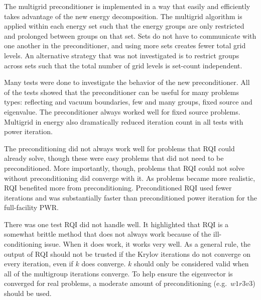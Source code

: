 The multigrid preconditioner is implemented in a way that easily and efficiently takes advantage of the new energy decomposition. The multigrid algorithm is applied within each energy set such that the energy groups are only restricted and prolonged between groups on that set. Sets do not have to communicate with one another in the preconditioner, and using more sets creates fewer total grid levels. An alternative strategy that was not investigated is to restrict groups across sets such that the total number of grid levels is set-count independent. 

Many tests were done to investigate the behavior of the new preconditioner. All of the tests showed that the preconditioner can be useful for many problems types: reflecting and vacuum boundaries, few and many groups, fixed source and eigenvalue. The preconditioner always worked well for fixed source problems. Multigrid in energy also dramatically reduced iteration count in all tests with power iteration. 

The preconditioning did not always work well for problems that RQI could already solve, though these were easy problems that did not need to be preconditioned. More importantly, though, problems that RQI could not solve without preconditioning did converge with it. As problems became more realistic, RQI benefited more from preconditioning. Preconditioned RQI used fewer iterations and was substantially faster than preconditioned power iteration for the full-facility PWR.

There was one test RQI did not handle well. It highlighted that RQI is a somewhat brittle method that does not always work because of the ill-conditioning issue. When it does work, it works very well. As a general rule, the output of RQI should not be trusted if the Krylov iterations do not converge on every iteration, even if $k$ does converge. $k$ should only be considered valid when all of the multigroup iterations converge. To help ensure the eigenvector is converged for real problems, a moderate amount of preconditioning (e.g.\ $w1r3v3$) should be used. 



